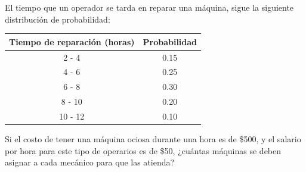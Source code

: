 \documentclass[11pt,letterpaper]{report}
\begin{document}
\begin{description}[leftmargin=1.2cm,style=nextline]
El tiempo que un operador se tarda en reparar una máquina, sigue la siguiente
distribución de probabilidad:

\begin{center}
\begin{tabular}{cc}
Tiempo de reparación (horas) & Probabilidad \\
\midrule
2 - 4   & 0.15 \\
4 - 6   & 0.25 \\
6 - 8   & 0.30 \\
8 - 10  & 0.20 \\
10 - 12 & 0.10 \\
\end{tabular}
\end{center}

Si el costo de tener una máquina ociosa durante una hora es de \$500, y el
salario por hora para este tipo de operarios es de \$50, ¿cuántas máquinas se
deben asignar a cada mecánico para que las atienda?

\end{description}
\end{document}
